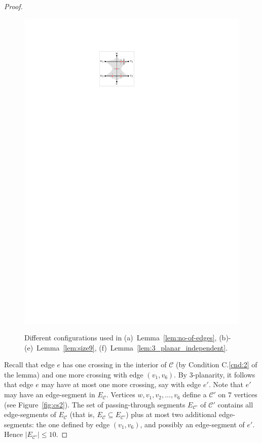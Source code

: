 \begin{proof}
\begin{figure}[t!]
\begin{minipage}[b]{.16\textwidth}
        \includegraphics[width=\textwidth,page=1]{images/3planar_independent}
        \subcaption{~}\label{fig:independent}
    \end{minipage}
    \caption{%
    Different configurations used in  
    (a)~Lemma~\ref{lem:no-of-edges},
    (b)-(e)~Lemma~\ref{lem:size9}, 
    (f)~Lemma~\ref{lem:3_planar_independent}.}
    \label{fig:replacements_2}
\end{figure}

Recall that edge $e$ has one crossing in the interior of $\mathcal{C}$ (by Condition C.\ref{cnd:2} of the lemma) and one more crossing with edge $(v_1,v_6)$. By $3$-planarity, it follows that edge $e$ may have at most one more crossing, say with edge $e'$. Note that $e'$ may have an edge-segment in $E_{\mathcal{C}}$. Vertices $w,v_1,v_2,\dots,v_6$ define a \pp $\mathcal{C}'$ on $7$ vertices (see Figure~\ref{fig:cs2}). The set of passing-through segments $E_{\mathcal{C}'}$ of $\mathcal{C}'$ contains all edge-segments of $E_{\mathcal{C}}$ (that is, $E_{\mathcal{C}} \subseteq E_{\mathcal{C}'}$) plus at most two additional edge-segments: the one defined by edge $(v_1,v_6)$, and possibly an edge-segment of $e'$. Hence $|E_{\mathcal{C}'}| \leq 10$. 


\end{proof}
